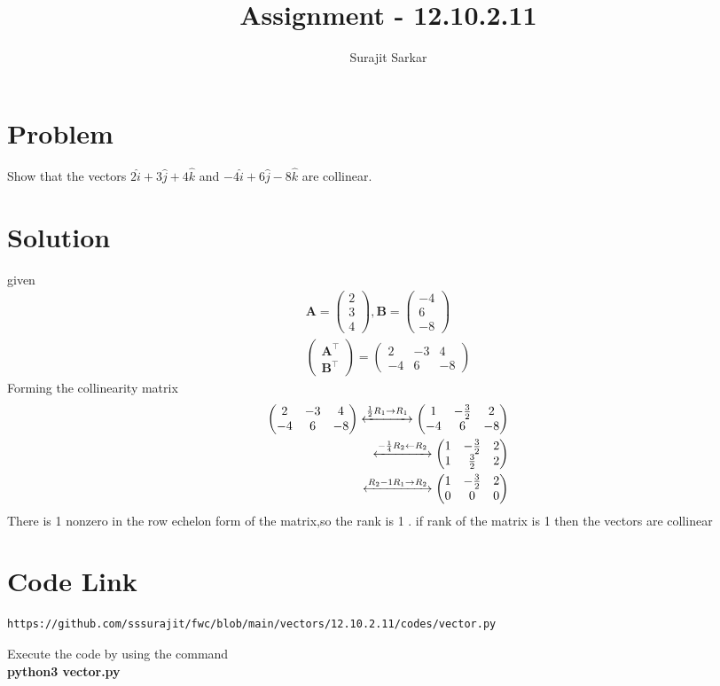 \documentclass[12pt]{article}
\title{\mytitle}
\title{
Assignment - 12.10.2.11
}
\author{Surajit Sarkar}
\newcommand{\myvec}[1]{\ensuremath{\begin{pmatrix}#1\end{pmatrix}}}
\let\vec\mathbf
\begin{document}
\maketitle
\tableofcontents
\bigskip
\section{\textbf{Problem}}
Show that the vectors $2\hat{i}+3\hat{j}+4\hat{k}$ and $-4\hat{i}+6\hat{j}-8\hat{k}$ are collinear.
\section{\textbf{Solution}}
given
\begin{align}
\vec{A}=\myvec{2\\3\\4},\vec{B}=\myvec{-4\\6\\-8}\\
\myvec{\vec{A}^{\top}\\ \vec{B}^{\top}}=\myvec{2&-3&4\\-4&6&-8}
 \end{align}
 Forming the collinearity matrix
 \begin{align}        
\myvec{2&-3&4\\-4&6&-8} \xleftrightarrow{\frac{1}{2}R_1\to R_1}\myvec{1&-\frac{3}{2}&2\\-4&6&-8}\\
\xleftrightarrow{-\frac{1}{4}R_2\leftarrow R_2}\myvec{1&-\frac{3}{2}&2\\1&\frac{3}{2}&2}\\
\xleftrightarrow{R_2-1R_1\to R_2}\myvec{1&-\frac{3}{2}&2\\0&0&0}
\end{align}
There is 1 nonzero in the row echelon form of the matrix,so the rank is 1 .
if rank of the matrix is 1 then the vectors are collinear
\section{\textbf{Code Link}}
\begin{lstlisting}
https://github.com/sssurajit/fwc/blob/main/vectors/12.10.2.11/codes/vector.py
\end{lstlisting}
Execute the code by using the command\\
\textbf{python3 vector.py}
\end{document}
